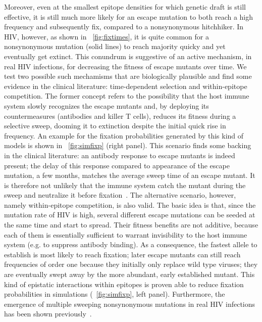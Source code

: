 \documentclass[12pt,a4paper,notitlepage,onecolumn]{article}
\begin{document}
Moreover, even at the smallest epitope densities for which genetic draft is
still effective, it is still much more likely for an escape mutation to both
reach a high frequency and subsequently fix, compared to a nonsynonymous
hitchhiker. In HIV, however, as shown in \figurename~\ref{fig:fixtimes}, it is
quite common for a nonsynonymous mutation (solid lines) to reach majority quicky
and yet eventually get extinct. This conundrum is suggestive of an active
mechanism, in real HIV infections, for decreasing the fitness of escape mutants
over time. We test two possible such mechamisms that are biologically plausible
and find some evidence in the clinical literature: time-dependent selection and
within-epitope competition. The former concept refers to the possibility that
the host immune system slowly recognizes the escape mutants and, by deploying
its countermeasures (antibodies and killer T cells), reduces its fitness during
a selective sweep, dooming it to extinction despite the initial quick rise in
frequency. An example for the fixation probabilities generated by this kind of
models is shown in \figurename~\ref{fig:simfixp} (right panel). This scenario
finds some backing in the clinical literature: an antibody response to escape
mutants is indeed present; the delay of this response compared to appearance of
the escape mutation, a few months, matches the average sweep time of an escape
mutant. It is therefore not unlikely that the immune system catch the mutant
during the sweep and neutralize it before fixation~\citep{richman_rapid_2003,
bunnik_autologous_2008}. The alternative scenario, however, namely
within-epitope competition, is also valid. The basic idea is that, since the
mutation rate of HIV is high, several different escape mutations can be seeded
at the same time and start to spread. Their fitness benefits are not additive,
because each of them is essentially sufficient to warrant invisibility to the
host immune system (e.g. to suppress antibody binding). As a consequence, the
fastest allele to establish is most likely to reach fixation; later escape
mutants can still reach frequencies of order one because they initially only
replace wild type viruses; they are eventually swept away by the more abundant,
early established mutant. This kind of epistatic interactions within epitopes is
proven able to reduce fixation probabilities in simulations
(\figurename~\ref{fig:simfixp}, left panel). Furthermore, the emergence of
multiple sweeping nonsynonymous mutations in real HIV infections has been shown
previously~\citep{moore_limited_2009}.
\end{document}
